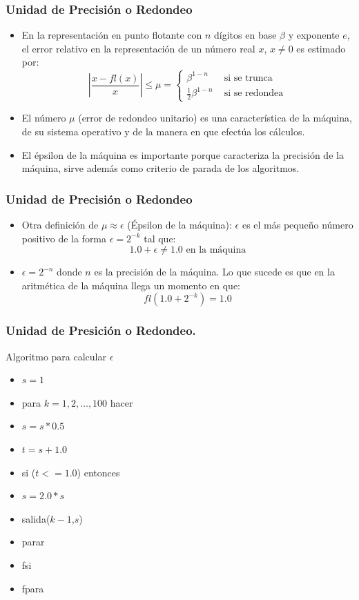 \documentclass{beamer}
\begin{document}
\frame
{
  \frametitle{Unidad de Precisi\'on o Redondeo} 
  \begin{itemize}
    \item<1-> En la representaci\'on en punto flotante con $n$ d\'igitos en base $\beta$ y exponente $e$, el error relativo en la
    representaci\'on de un n\'umero real $x$, $x\neq0$ es estimado por:     
    $$
    \left|\frac{x-fl(x)}{x}\right|\leq \mu = \left\{\begin{array}{ll}
      \beta^{1-n} & \mbox{ si se trunca}\\
      \frac{1}{2}\beta^{1-n} & \mbox{ si se redondea}
      \end{array}
    \right.
    $$     
    \item<2->El n\'umero $\mu$ (error de redondeo unitario) es una caracter\'istica de la m\'aquina, de su sistema operativo y de la manera en que efect\'ua los c\'alculos. 
    \item<3-> El \'epsilon de la m\'aquina es importante porque caracteriza la precisi\'on de la m\'aquina, sirve adem\'as como criterio de parada de los algoritmos.
  \end{itemize}
}
\begin{frame}
  \frametitle{Unidad de Precisi\'on o Redondeo} 
  \begin{itemize}
    \item Otra definici\'on de $\mu \approx \epsilon$ (\'Epsilon de la m\'aquina): $\epsilon$ es el m\'as peque\~no n\'umero positivo de la forma $\epsilon = 2^{-k}$ tal que:
    $$
    1.0 + \epsilon \neq 1.0 \mbox{  en la m\'aquina}
    $$
    \item<2-> $\epsilon = 2^{-n}$ donde $n$ es la precisi\'on de la m\'aquina. Lo que sucede es que en la aritm\'etica de la m\'aquina llega un momento en que:    
    $$
    fl(1.0 + 2^{-k}) = 1.0
    $$    
  \end{itemize}
\end{frame}
\frame
{
  \frametitle{Unidad de Presici\'on o Redondeo.}
  Algoritmo para calcular $\epsilon$
  \begin{itemize}
  \item<1->[1.] $s=1$
  \item<2->[2.] para $k=1,2,\ldots,100$ hacer
  \item<3->[3.] \qquad $s= s*0.5$
  \item<4->[4.] \qquad $t=s+1.0$
  \item<5->[5.] \qquad si ($t<=1.0$) entonces
  \item<6->[6.] \qquad\qquad $s=2.0*s$
  \item<7->[7.] \qquad\qquad salida($k-1$,$s$)
  \item<8->[8.] \qquad\qquad parar
  \item<9->[9.] \qquad fsi
  \item<10->[10.] fpara
  \end{itemize}
}
\end{document}
